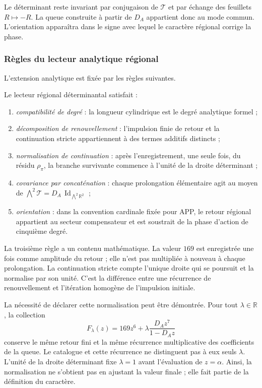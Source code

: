 Le déterminant reste invariant par conjugaison de \(\mathcal T\) et par échange des feuillets \(R\mapsto-R\). La queue construite à partir de \(D_A\) appartient donc au mode commun. L'orientation apparaîtra dans le signe avec lequel le caractère régional corrige la phase.

\subsubsection{Règles du lecteur analytique régional}

L'extension analytique est fixée par les règles suivantes.

\begin{definition}
\label{p12-83-c13-s3:def:lector-regional-determinantal}
Le lecteur régional déterminantal satisfait :
\begin{enumerate}
  \item \emph{compatibilité de degré} : la longueur cylindrique est le degré
  analytique formel ;
  \item \emph{décomposition de renouvellement} : l'impulsion finie de retour et
  la continuation stricte appartiennent à des termes additifs distincts ;
  \item \emph{normalisation de continuation} : après l'enregistrement, une seule
  fois, du résidu \(\rho_\pi\), la branche survivante commence à l'unité de
  la droite déterminant ;
  \item \emph{covariance par concaténation} : chaque prolongation élémentaire
  agit au moyen de
  \(\bigwedge^2\mathcal T=D_A\,\operatorname{Id}_{\bigwedge^2\mathbb R^2}\) ;
  \item \emph{orientation} : dans la convention cardinale fixée pour APP, le retour régional appartient au secteur compensateur et est soustrait de la phase d'action de cinquième degré.
\end{enumerate}
\end{definition}

La troisième règle a un contenu mathématique. La valeur \(169\) est enregistrée
une fois comme amplitude du retour ; elle n'est pas multipliée à nouveau à chaque
prolongation. La continuation stricte compte l'unique droite qui se poursuit et
la normalise par son unité. C'est la différence entre une récurrence de
renouvellement et l'itération homogène de l'impulsion initiale.

La nécessité de déclarer cette normalisation peut être démontrée. Pour tout
\(\lambda\in\mathbb R\), la collection
\[
F_\lambda(z)
=169z^6+\lambda\frac{D_Az^7}{1-D_Az}
\]
conserve le même retour fini et la même récurrence multiplicative des
coefficients de la queue. Le catalogue et cette récurrence ne distinguent pas à eux seuls
\(\lambda\). L'unité de la droite déterminant fixe
\(\lambda=1\) avant l'évaluation de \(z=\alpha\). Ainsi, la normalisation
ne s'obtient pas en ajustant la valeur finale ; elle fait partie de la définition du
caractère.

